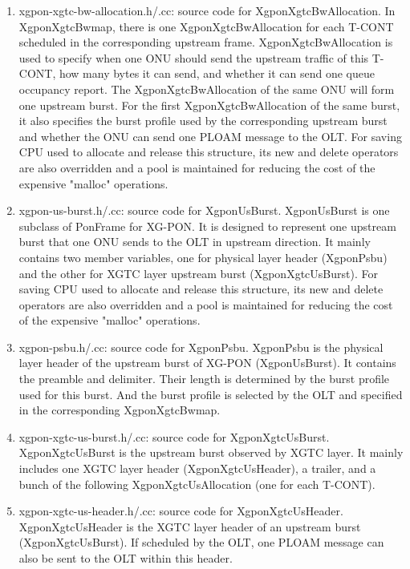 \begin{enumerate}
 \item xgpon-xgtc-bw-allocation.h/.cc: source code for {\color{red} XgponXgtcBwAllocation}. In XgponXgtcBwmap, 
there is one XgponXgtcBwAllocation for each T-CONT scheduled in the corresponding upstream frame. 
XgponXgtcBwAllocation is used to specify when one ONU should send the upstream traffic of this T-CONT, 
how many bytes it can send, and whether it can send one queue occupancy report. The XgponXgtcBwAllocation of 
the same ONU will form one upstream burst. For the first XgponXgtcBwAllocation of the same burst, 
it also specifies the burst profile used by the corresponding upstream burst and whether the ONU can 
send one PLOAM message to the OLT.  For saving CPU used to allocate and release this structure, 
its new and delete operators are also overridden and a pool is maintained for reducing the cost of 
the expensive "malloc" operations.
\vspace{0.1in}

 \item xgpon-us-burst.h/.cc: source code for {\color{red} XgponUsBurst}. XgponUsBurst is one subclass 
of PonFrame for XG-PON. It is designed to represent one upstream burst that one ONU sends to the OLT 
in upstream direction. It mainly contains two member variables, one for physical layer header (XgponPsbu) 
and the other for XGTC layer upstream burst (XgponXgtcUsBurst). For saving CPU used to allocate and 
release this structure, its new and delete operators are also overridden and a pool is maintained for 
reducing the cost of the expensive "malloc" operations.

 \item xgpon-psbu.h/.cc: source code for {\color{red} XgponPsbu}. XgponPsbu is the physical layer header 
of the upstream burst of XG-PON (XgponUsBurst). It contains the preamble and delimiter. 
Their length is determined by the burst profile used for this burst. And the burst profile is 
selected by the OLT and specified in the corresponding XgponXgtcBwmap.

 \item xgpon-xgtc-us-burst.h/.cc: source code for {\color{red} XgponXgtcUsBurst}. 
XgponXgtcUsBurst is the upstream burst observed by XGTC layer. It mainly includes 
one XGTC layer header (XgponXgtcUsHeader), a trailer, and a bunch of the following 
XgponXgtcUsAllocation (one for each T-CONT).

 \item xgpon-xgtc-us-header.h/.cc: source code for {\color{red} XgponXgtcUsHeader}. XgponXgtcUsHeader 
is the XGTC layer header of an upstream burst (XgponXgtcUsBurst). If scheduled by the OLT, 
one PLOAM message can also be sent to the OLT within this header.


\end{enumerate}

